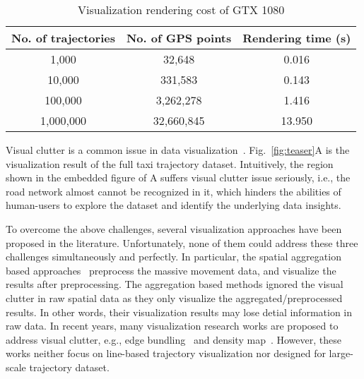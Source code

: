 \begin{table}
	\centering
    \small
	\caption{Visualization rendering cost of GTX 1080}
	\begin{tabular}{|c|c|c|} \hline
		No. of trajectories & No. of GPS points & Rendering time (s) \\ \hline
		1,000& 32,648 & 0.016\\ \hline
		10,000& 331,583 & 0.143\\ \hline
		100,000& 3,262,278 & 1.416\\ \hline
		1,000,000& 32,660,845 & 13.950\\ \hline
	\end{tabular}	\label{tab:gpu}
\end{table}

Visual clutter is a common issue in data visualization~\cite{clutter}.
Fig.~\ref{fig:teaser}A is the visualization result of the full \pt{} taxi trajectory dataset.
Intuitively, the region shown in the embedded figure of A suffers visual clutter issue seriously,
i.e., the road network almost cannot be recognized in it,
which hinders the abilities of human-users to explore the dataset and identify the underlying data insights.



To overcome the above challenges, several visualization approaches have been proposed in the literature.
Unfortunately, none of them could address these three challenges simultaneously and perfectly.
In particular, the spatial aggregation based approaches~\cite{zeng2013visualizing,von2015mobilitygraphs} preprocess the massive movement data, and visualize the results after preprocessing.
The aggregation based methods ignored the visual clutter in raw spatial data as they only visualize the aggregated/preprocessed results.
In other words, their visualization results may lose detial information in raw data.
In recent years, many visualization research works are proposed to address visual clutter,
e.g., edge bundling~\cite{zeng2019route, thony2015vector} and density map~\cite{lampe2011interactive, scheepens2011interactive}.
However, these works neither focus on line-based trajectory visualization nor designed for large-scale trajectory dataset.


